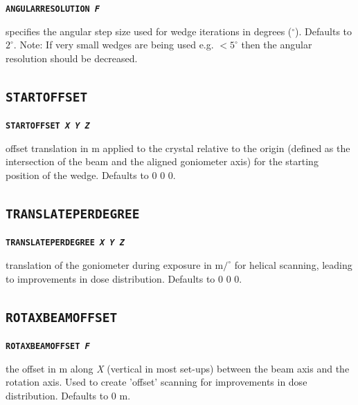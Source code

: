 \documentclass[a4paper]{article}
\newcommand{\Keyword}[1]{\texttt{\textbf{#1}}\xspace}
\begin{document}
\noindent \Keyword{ANGULARRESOLUTION \textit{F}}

specifies the angular step size used for wedge iterations in degrees ($^\circ$). Defaults to $2^\circ$.
\newline
Note: If very small wedges are being used e.g. $<5^{\circ}$ then the angular resolution should be decreased.



\subsection{\Keyword{STARTOFFSET}}

\noindent \Keyword{STARTOFFSET \textit{X Y Z}}

offset translation in \hbox{\textmu}m applied to the crystal relative to the origin (defined as the intersection of the beam and the aligned goniometer axis) for the starting position of the wedge. Defaults to 0 0 0.



\subsection{\Keyword{TRANSLATEPERDEGREE}}

\noindent \Keyword{TRANSLATEPERDEGREE \textit{X Y Z}}

translation of the goniometer during exposure in \hbox{\textmu}m$/^{\circ}$ for helical scanning, leading to improvements in dose distribution. Defaults to 0 0 0.



\subsection{\Keyword{ROTAXBEAMOFFSET}}

\noindent \Keyword{ROTAXBEAMOFFSET \textit{F}}

the offset in \hbox{\textmu}m along \textit{X} (vertical in most set-ups) between the beam axis and the rotation axis. Used to create 'offset' scanning for improvements in dose distribution. Defaults to 0 \hbox{\textmu}m.
\end{document}
